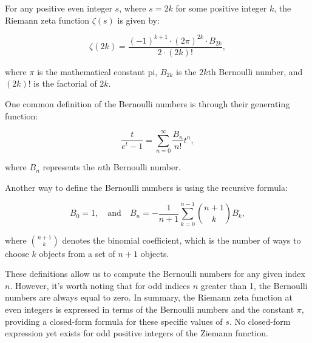 {\begin{itemize}
		For any positive even integer \(s\), where \(s = 2k\) for some positive integer \(k\), the Riemann zeta function \(\zeta(s)\) is given by:

		\[\zeta(2k) = \frac{(-1)^{k+1} \cdot (2\pi)^{2k} \cdot B_{2k}}{2 \cdot (2k)!},\]

		where \(\pi\) is the mathematical constant pi, \(B_{2k}\) is the \(2k\)th Bernoulli number, and \((2k)!\) is the factorial of \(2k\).

		One common definition of the Bernoulli numbers is through their generating function:

		\[
		\frac{t}{e^t - 1} = \sum_{n=0}^{\infty} \frac{B_n}{n!} t^n,
		\]

		where \(B_n\) represents the \(n\)th Bernoulli number.

		Another way to define the Bernoulli numbers is using the recursive formula:

		\[
		B_0 = 1, \quad \text{and} \quad B_n = -\frac{1}{n+1} \sum_{k=0}^{n-1} \binom{n+1}{k} B_k,
		\]

		where \(\binom{n+1}{k}\) denotes the binomial coefficient, which is the number of ways to choose \(k\) objects from a set of \(n+1\) objects.

		These definitions allow us to compute the Bernoulli numbers for any given index \(n\). However, it's worth noting that for odd indices \(n\) greater than 1, the Bernoulli numbers are always equal to zero.			
		In summary, the Riemann zeta function at even integers is expressed in terms of the Bernoulli numbers and the constant \(\pi\), providing a closed-form formula for these specific values of \(s\). No closed-form expression yet exists for odd positive integers of the Ziemann function.
	\end{itemize}
}

